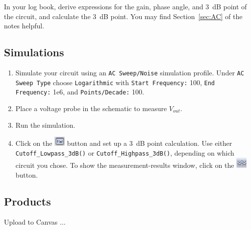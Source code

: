 \documentclass[11pt]{article}
\begin{document}
In your log book, derive expressions for the gain, phase angle, and 
3~dB point of the circuit, and calculate the 3~dB point. You may find
Section~\ref{sec:AC} of the notes helpful.

\subsection*{Simulations}

\begin{enumerate}
\item Simulate your circuit using an \texttt{AC Sweep/Noise}
  simulation profile. Under \texttt{AC Sweep Type} choose
  \texttt{Logarithmic} with \texttt{Start Frequency:} 100,
  \texttt{End Frequency:} 1e6, and \texttt{Points/Decade:} 100. 

\item Place a voltage probe in the schematic to measure $V_{out}$.

\item Run the simulation.

\item Click on the \includegraphics{PSpiceAD_DefineMeasurement.png}
  button and set up a 3~dB point calculation. Use either
  \verb+Cutoff_Lowpass_3dB()+ or \verb+Cutoff_Highpass_3dB()+,
  depending on which circuit you chose. To show the
  measurement-results window, click on the
  \includegraphics{PSpiceAD_ToggleMeasurement.png} button.
\end{enumerate}

\subsection*{Products}

Upload to Canvas ...
\end{document}
